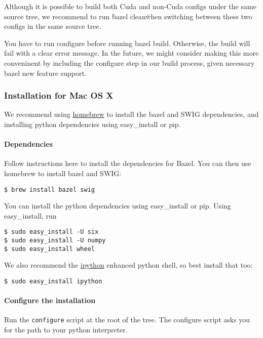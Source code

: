 Although it is possible to build both Cuda and non-Cuda configs under the same source tree, we recommend to run \"bazel clean\" when switching between these two configs in the same source tree.

You have to run configure before running bazel build. Otherwise, the build will fail with a clear error message. In the future, we might consider making this more conveninent by including the configure step in our build process, given necessary bazel new feature support.


\subsubsection {Installation for Mac OS X}

We recommend using \href{http://brew.sh/}{homebrew} to install the bazel and SWIG dependencies, and installing python dependencies using easy_install or pip.

\paragraph{Dependencies}

Follow instructions here to install the dependencies for Bazel. You can then use homebrew to install bazel and SWIG:

\begin{lstlisting}
$ brew install bazel swig
\end{lstlisting}

You can install the python dependencies using easy_install or pip. Using easy_install, run

\begin{lstlisting}
$ sudo easy_install -U six
$ sudo easy_install -U numpy
$ sudo easy_install wheel
\end{lstlisting}

We also recommend the \href{https://ipython.org/}{ipython} enhanced python shell, so best install that too:

\begin{lstlisting}
$ sudo easy_install ipython
\end{lstlisting}

\paragraph{Configure the installation}

Run the \lstinline{configure} script at the root of the tree. The configure script asks you for the path to your python interpreter.

